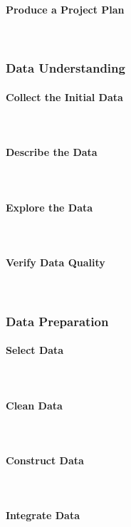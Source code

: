 \paragraph{Produce a Project Plan}\mbox{} \\

\subsubsection{Data Understanding}

\paragraph{Collect the Initial Data}\mbox{} \\
\paragraph{Describe the Data}\mbox{} \\
\paragraph{Explore the Data}\mbox{} \\
\paragraph{Verify Data Quality}\mbox{} \\
\subsubsection{Data Preparation}
\paragraph{Select Data}\mbox{} \\
\paragraph{Clean Data}\mbox{} \\
\paragraph{Construct Data}\mbox{} \\
\paragraph{Integrate Data}\mbox{} \\
